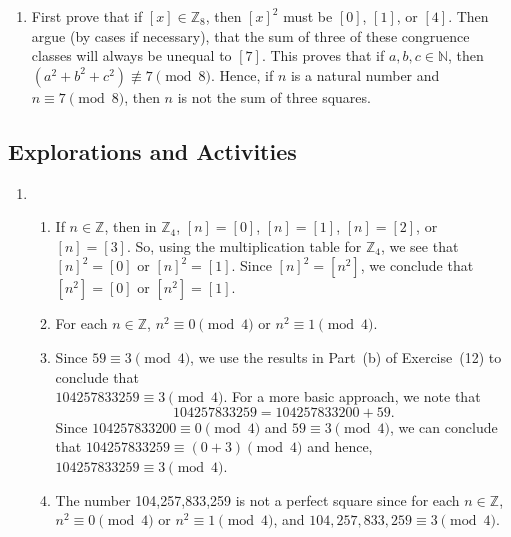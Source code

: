 \begin{enumerate}
\item First prove that if $\left[ x \right] \in \mathbb{Z}_8$, then $\left[ x \right]^2$ must be 
$\left[ 0 \right]$, $\left[ 1 \right]$, or $\left[ 4 \right]$.  Then argue (by cases if necessary), that the sum of three of these congruence classes will always be unequal to 
$\left[ 7 \right]$.  This proves that if $a, b ,c \in \mathbb{N}$, then 
$\left( a^2 + b^2 +c^2 \right) \not\equiv 7 \pmod 8$.  Hence, if $n$ is a natural number and 
$n \equiv 7 \pmod 8$, then $n$ is not the sum of three squares.
\end{enumerate}



\subsection*{Explorations and Activities}
\setcounter{oldenumi}{\theenumi}
\begin{enumerate} \setcounter{enumi}{\theoldenumi}
\item \begin{enumerate}
\item If  $n \in \mathbb{Z}$, then in  $\mathbb{Z}_4 $, $\left[ n \right] = \left[ 0 \right]$,
$\left[ n \right] = \left[ 1 \right]$, $\left[ n \right] = \left[ 2 \right]$, or 
$\left[ n \right] = \left[ 3 \right]$.  So, using the multiplication table for  $\mathbb{Z}_4 $, we see that  $\left[ n \right]^2  = \left[ 0 \right]$  or  
$\left[ n \right]^2  = \left[ 1 \right]$.  Since  $\left[ n \right]^2  = \left[ {n^2 } \right]$, we conclude that  $\left[ {n^2 } \right] = \left[ 0 \right]$  or  
$\left[ {n^2 } \right] = \left[ 1 \right]$.

\item For each  $n \in \mathbb{Z}$,  $n^2  \equiv 0 \pmod 4$  or  $n^2  \equiv 1 \pmod 4$.

\item Since  $59 \equiv 3 \pmod 4$, we use the results in Part~(b) of Exercise~(12) to conclude that  \\
$104 257 833 259 \equiv 3 \pmod 4$.  For a more basic approach, we note that
\[
104 257 833 259 = 104 257 833 200 + 59.
\]
Since $104 257 833 200 \equiv 0 \pmod 4$ and $59 \equiv 3 \pmod 4$, we can conclude that
$104 257 833 259 \equiv (0 + 3) \pmod 4$ and hence, $104 257 833 259 \equiv 3 \pmod 4$.

\item The number  104,257,833,259 is not a perfect square since for each  $n \in \mathbb{Z}$,  
$n^2  \equiv 0 \pmod 4$  or  $n^2  \equiv 1 \pmod 4$, and  
$104,257,833,259 \equiv 3 \pmod 4$.
\end{enumerate}

\end{enumerate}

\hbreak
\endinput

